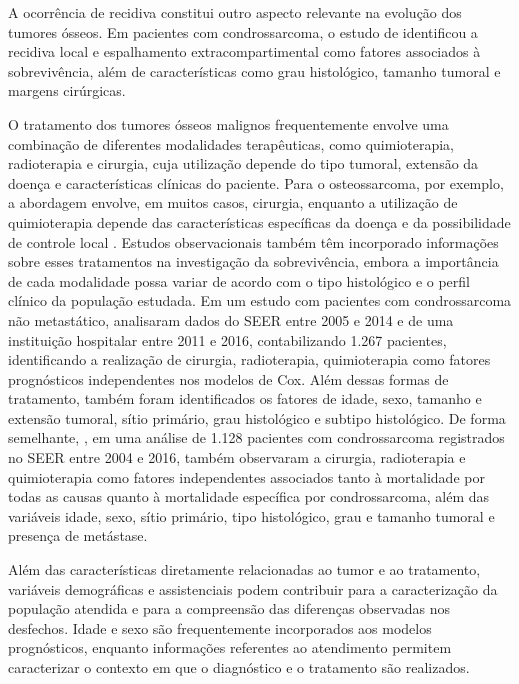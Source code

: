 \documentclass[11pt,a4paper]{article}
\begin{document}
A ocorrência de recidiva constitui outro aspecto relevante na evolução dos tumores ósseos. Em pacientes com condrossarcoma, o estudo de \cite{fiorenza2002risk} identificou a recidiva local e espalhamento extracompartimental como fatores associados à sobrevivência, além de características como grau histológico, tamanho tumoral e margens cirúrgicas.  

O tratamento dos tumores ósseos malignos frequentemente envolve uma combinação de diferentes modalidades terapêuticas, como quimioterapia, radioterapia e cirurgia, cuja utilização depende do tipo tumoral, extensão da doença e características clínicas do paciente. Para o osteossarcoma, por exemplo, a abordagem envolve, em muitos casos, cirurgia, enquanto a utilização de quimioterapia depende das características específicas da doença e da possibilidade de controle local \citep{biermann2025bone}. Estudos observacionais também têm incorporado informações sobre esses tratamentos na investigação da sobrevivência, embora a importância de cada modalidade possa variar de acordo com o tipo histológico e o perfil clínico da população estudada. Em um estudo com pacientes com condrossarcoma não metastático, \cite{huang2019identifying} analisaram dados do SEER entre 2005 e 2014 e de uma instituição hospitalar entre 2011 e 2016, contabilizando 1.267 pacientes, identificando a realização de cirurgia, radioterapia, quimioterapia como fatores prognósticos independentes nos modelos de Cox. Além dessas formas de tratamento, também foram identificados os fatores de idade, sexo, tamanho e extensão tumoral, sítio primário, grau histológico e subtipo histológico. De forma semelhante, \cite{hua2020treatment}, em uma análise de 1.128 pacientes com condrossarcoma registrados no SEER entre 2004 e 2016, também observaram a cirurgia, radioterapia e quimioterapia como fatores independentes associados tanto à mortalidade por todas as causas quanto à mortalidade específica por condrossarcoma, além das variáveis idade, sexo, sítio primário, tipo histológico, grau e tamanho tumoral e presença de metástase.

Além das características diretamente relacionadas ao tumor e ao tratamento, variáveis demográficas e assistenciais podem contribuir para a caracterização da população atendida e para a compreensão das diferenças observadas nos desfechos. Idade e sexo são frequentemente incorporados aos modelos prognósticos, enquanto informações referentes ao atendimento permitem caracterizar o contexto em que o diagnóstico e o tratamento são realizados. 
\end{document}

